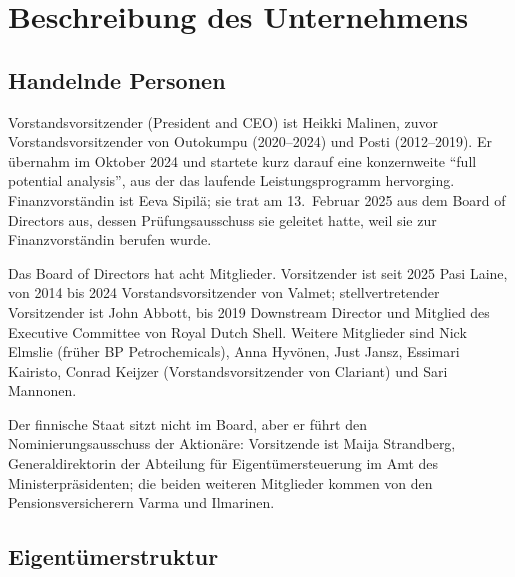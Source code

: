 \section{Beschreibung des Unternehmens}
\label{sec:unternehmen}

\subsection{Handelnde Personen}

Vorstandsvorsitzender (President and CEO) ist Heikki Malinen, zuvor Vorstandsvorsitzender
von Outokumpu (2020--2024) und Posti (2012--2019). Er \"ubernahm im Oktober 2024
und startete kurz darauf eine konzernweite \enquote{full potential analysis}, aus der das
laufende Leistungsprogramm hervorging. Finanzvorst\"andin ist Eeva Sipil\"a; sie trat am 13.~Februar 2025 aus dem Board of
Directors aus, dessen Pr\"ufungsausschuss sie geleitet hatte, weil sie zur Finanzvorst\"andin
berufen wurde.

Das Board of Directors hat acht Mitglieder. Vorsitzender ist seit 2025 Pasi
Laine, von 2014 bis 2024 Vorstandsvorsitzender von Valmet; stellvertretender Vorsitzender
ist John Abbott, bis 2019 Downstream Director und Mitglied des Executive Committee von Royal
Dutch Shell. Weitere Mitglieder sind Nick Elmslie (fr\"uher BP Petrochemicals),
Anna Hyv\"onen, Just Jansz, Essimari Kairisto, Conrad Keijzer (Vorstandsvorsitzender von
Clariant) und Sari Mannonen.

Der finnische Staat sitzt nicht im Board, aber er f\"uhrt den Nominierungsausschuss der
Aktion\"are: Vorsitzende ist Maija Strandberg, Generaldirektorin der Abteilung f\"ur
Eigent\"umersteuerung im Amt des Ministerpr\"asidenten; die beiden weiteren Mitglieder kommen
von den Pensionsversicherern Varma und Ilmarinen. 

\subsection{Eigent\"umerstruktur}

